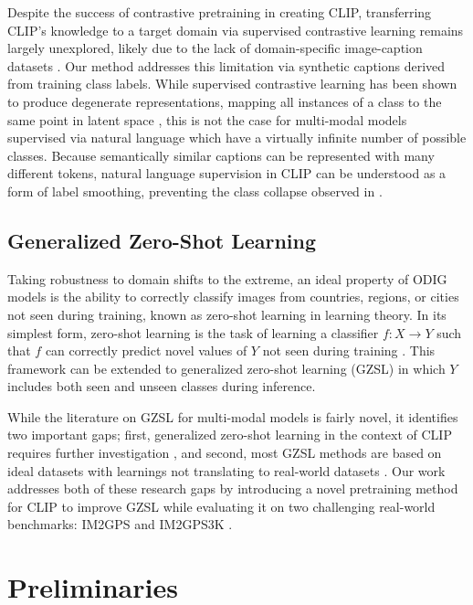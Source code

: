 \documentclass{article}
\renewcommand{\cite}[1]{\citep{#1}}
\begin{document}
Despite the success of contrastive pretraining in creating CLIP, transferring CLIP's knowledge to a target domain via supervised contrastive learning \cite{khosla_2020} remains largely unexplored, likely due to the lack of domain-specific image-caption datasets \cite{clip_rsicd}. Our method addresses this limitation via synthetic captions derived from training class labels. While supervised contrastive learning has been shown to produce degenerate representations, mapping all instances of a class to the same point in latent space \cite{chen_2022d}, this is not the case for multi-modal models supervised via natural language which have a virtually infinite number of possible classes. Because semantically similar captions can be represented with many different tokens, natural language supervision in CLIP can be understood as a form of label smoothing, preventing the class collapse observed in \citet{chen_2022d}.

\subsection{Generalized Zero-Shot Learning}

Taking robustness to domain shifts to the extreme, an ideal property of ODIG models is the ability to correctly classify images from countries, regions, or cities not seen during training, known as zero-shot learning in learning theory. In its simplest form, zero-shot learning is the task of learning a classifier $f : X \rightarrow Y$ such that $f$ can correctly predict novel values of $Y$ not seen during training \cite{palatucci_2009}. This framework can be extended to generalized zero-shot learning (GZSL) in which $Y$ includes both seen and unseen classes during inference.

While the literature on GZSL for multi-modal models is fairly novel, it identifies two important gaps; first, generalized zero-shot learning in the context of CLIP requires further investigation \cite{pourpanah_2022}, and second, most GZSL methods are based on ideal datasets with learnings not translating to real-world datasets \cite{pourpanah_2022}. Our work addresses both of these research gaps by introducing a novel pretraining method for CLIP to improve GZSL while evaluating it on two challenging real-world benchmarks: IM2GPS \cite{hays_2008} and IM2GPS3K \cite{vo_et_al}.

\section{Preliminaries}
\label{sec:prelimiaries}
\end{document}
